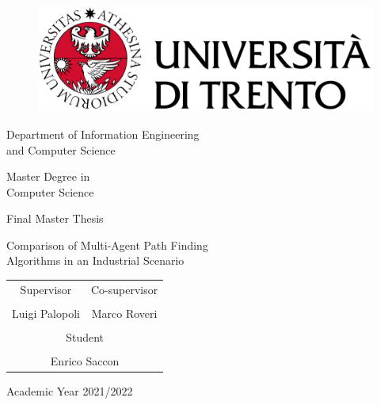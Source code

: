 \pagestyle{plain}

\thispagestyle{empty}

\begin{center}
	\begin{figure}[htp]
    \centering
    \includegraphics[width=0.6\linewidth]{logo_unitn_new}
	\end{figure}
	
	\vspace{2 cm} 
	
	{\huge Department of Information Engineering\\and Computer Science\\}
	
	\vspace{1 cm} 
	{\LARGE Master Degree in\\
			Computer Science
		}
	
	\vspace{1 cm} 
	{\LARGE\textsc Final Master Thesis\\} 

	\vspace{1 cm} 
	{\Huge\textsc Comparison of Multi-Agent Path Finding\\Algorithms in an Industrial Scenario\\} 
	\vspace{2 cm} 
	\begin{tabular*}{\textwidth}{ c @{\extracolsep{\fill}} c }
    {\Large Supervisor}&        {\Large Co-supervisor}\\
                       &\\                            
    {\LARGE Luigi Palopoli}&    {\LARGE Marco Roveri} \\
                           &\\
    \multicolumn{2}{c}{\Large Student}      \\
                          \\
    \multicolumn{2}{c}{\LARGE Enrico Saccon} \\
                              
	\end{tabular*}
	
	\vspace{2 cm} 
	
	\Large{Academic Year 2021/2022}
  
\end{center}

